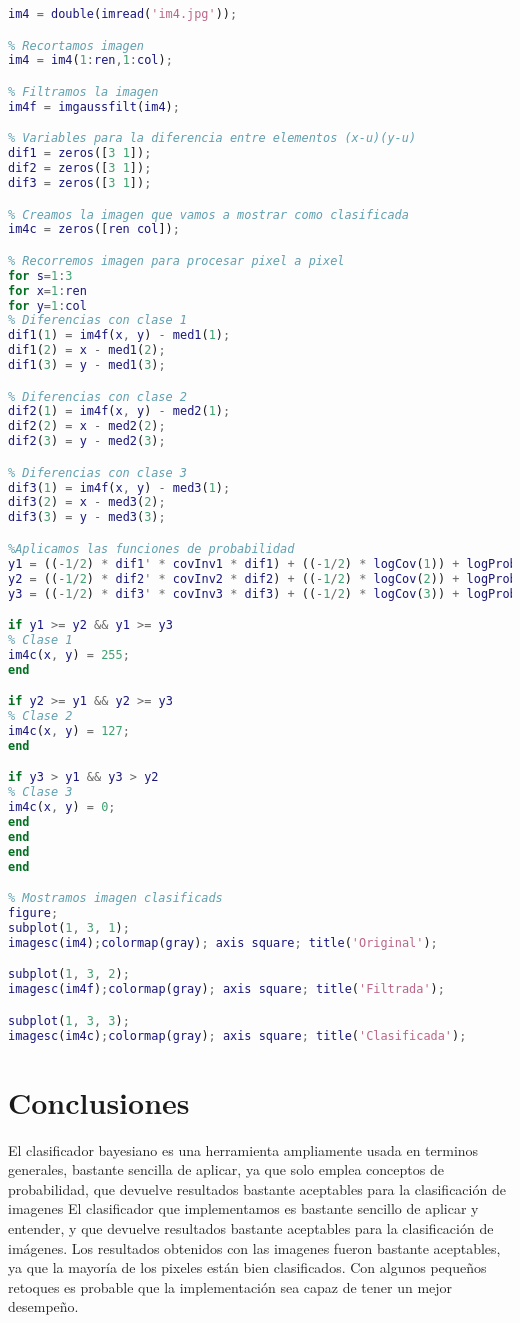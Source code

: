 \documentclass[10pt,journal,compsoc]{IEEEtran}\usepackage[T1]{fontenc}                              %
\begin{document}
\begin{lstlisting}[language=Matlab,basicstyle=\small]
% Abrimos imagen a clasificar como double
im4 = double(imread('im4.jpg'));

% Recortamos imagen
im4 = im4(1:ren,1:col);

% Filtramos la imagen
im4f = imgaussfilt(im4);

% Variables para la diferencia entre elementos (x-u)(y-u)
dif1 = zeros([3 1]);
dif2 = zeros([3 1]);
dif3 = zeros([3 1]);

% Creamos la imagen que vamos a mostrar como clasificada
im4c = zeros([ren col]);

% Recorremos imagen para procesar pixel a pixel
for s=1:3
for x=1:ren
for y=1:col
% Diferencias con clase 1
dif1(1) = im4f(x, y) - med1(1);
dif1(2) = x - med1(2);
dif1(3) = y - med1(3);

% Diferencias con clase 2
dif2(1) = im4f(x, y) - med2(1);
dif2(2) = x - med2(2);
dif2(3) = y - med2(3);

% Diferencias con clase 3
dif3(1) = im4f(x, y) - med3(1);
dif3(2) = x - med3(2);
dif3(3) = y - med3(3);

%Aplicamos las funciones de probabilidad
y1 = ((-1/2) * dif1' * covInv1 * dif1) + ((-1/2) * logCov(1)) + logProb(1);
y2 = ((-1/2) * dif2' * covInv2 * dif2) + ((-1/2) * logCov(2)) + logProb(2);
y3 = ((-1/2) * dif3' * covInv3 * dif3) + ((-1/2) * logCov(3)) + logProb(3);

if y1 >= y2 && y1 >= y3
% Clase 1
im4c(x, y) = 255;
end

if y2 >= y1 && y2 >= y3
% Clase 2
im4c(x, y) = 127;
end

if y3 > y1 && y3 > y2
% Clase 3
im4c(x, y) = 0;
end
end
end
end

% Mostramos imagen clasificads
figure;
subplot(1, 3, 1);
imagesc(im4);colormap(gray); axis square; title('Original');

subplot(1, 3, 2);
imagesc(im4f);colormap(gray); axis square; title('Filtrada');

subplot(1, 3, 3);
imagesc(im4c);colormap(gray); axis square; title('Clasificada');


\end{lstlisting}
\section{Conclusiones}

El clasificador bayesiano es una herramienta ampliamente usada en terminos generales, bastante sencilla de aplicar, ya que solo emplea conceptos de probabilidad, que devuelve resultados bastante aceptables para la clasificación de imagenes
El clasificador que implementamos es bastante sencillo de aplicar y entender, y  que devuelve resultados bastante aceptables para la clasificación de imágenes.
Los resultados obtenidos con las imagenes fueron bastante aceptables, ya que la mayoría de los pixeles están bien clasificados. Con algunos pequeños retoques es probable que la implementación sea capaz de tener un mejor desempeño.
\end{document}
